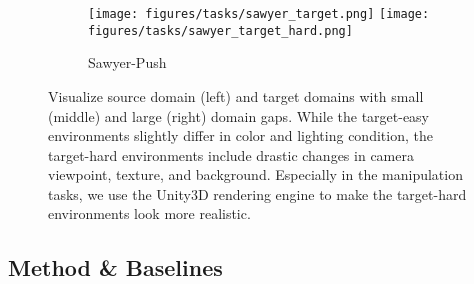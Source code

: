 \begin{figure}[t]
\begin{subfigure}[t]{\linewidth}
        \texttt{[image: figures/tasks/sawyer\_target.png]}        
        \texttt{[image: figures/tasks/sawyer\_target\_hard.png]}
        \caption{Sawyer-Push}
    \end{subfigure}
    \caption{
        Visualize source domain (left) and target domains with small (middle) and large (right) domain gaps. While the target-easy environments slightly differ in color and lighting condition, the target-hard environments include drastic changes in camera viewpoint, texture, and background. Especially in the manipulation tasks, we use the Unity3D rendering engine to make the target-hard environments look more realistic. 
    }
    \label{fig:tasks}
\end{figure}


\subsection{Method \& Baselines}


